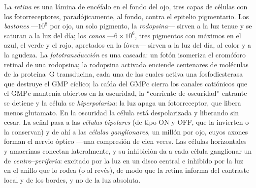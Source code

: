 \begin{definition}[La retina]\label{def:b3:sensory-systems:retina}
La \emph{retina} es una lámina de encéfalo en el fondo del ojo, tres
capas de células con los fotorreceptores, paradójicamente, al fondo,
contra el epitelio pigmentario. Los \emph{bastones} ---$10^{8}$ por
ojo, un solo pigmento, la \emph{rodopsina}--- sirven a la luz tenue y
se saturan a la luz del día; los \emph{conos} ---$6\times 10^{6}$, tres
pigmentos con máximos en el azul, el verde y el rojo, apretados en la
fóvea--- sirven a la luz del día, al color y a la agudeza. La
\emph{fototransducción} es una cascada: un fotón isomeriza el cromóforo
retinal de una rodopsina; la rodopsina activada enciende centenares de
moléculas de la proteína~G transducina, cada una de las cuales activa
una fosfodiesterasa que destruye el GMP cíclico; la caída del GMPc
cierra los canales catiónicos que el GMPc mantenía abiertos en la
oscuridad, la ``corriente de oscuridad'' entrante se detiene y la
célula se \emph{hiperpolariza}: la luz apaga un fotorreceptor, que
libera menos glutamato. En la oscuridad la célula está despolarizada y
liberando sin cesar. La señal pasa a las \emph{células bipolares} (de
tipo ON y OFF, que la invierten o la conservan) y de ahí a las
\emph{células ganglionares}, un millón por ojo, cuyos axones forman el
nervio óptico ---una compresión de cien veces. Las células
horizontales y amacrinas conectan lateralmente, y su inhibición da a
cada célula ganglionar un  de \emph{centro--periferia}:
excitado por la luz en un disco central e inhibido por la luz en el
anillo que lo rodea (o al revés), de modo que la retina informa del
contraste local y de los bordes, y no de la luz absoluta.
\end{definition}

